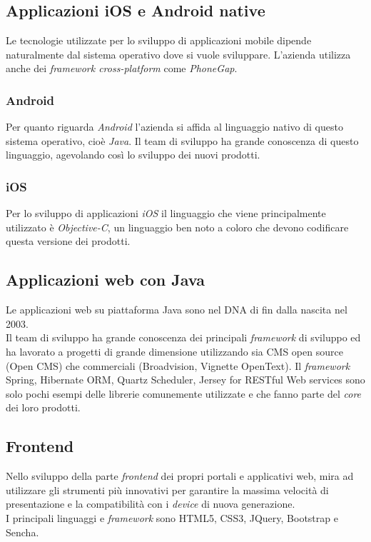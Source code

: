 \subsection{Applicazioni iOS e Android native}
Le tecnologie utilizzate per lo sviluppo di applicazioni mobile dipende naturalmente dal sistema operativo dove si vuole sviluppare. L'azienda utilizza anche dei \emph{framework cross-platform} come \emph{PhoneGap}.
\subsubsection{Android}
Per quanto riguarda \emph{Android} l'azienda si affida al linguaggio nativo di questo sistema operativo, cioè \emph{Java}. 
Il team di sviluppo ha grande conoscenza di questo linguaggio, agevolando così lo sviluppo dei nuovi prodotti.
\subsubsection{iOS}
Per lo sviluppo di applicazioni \emph{iOS} il linguaggio che viene principalmente utilizzato è \emph{Objective-C}, un linguaggio ben noto a coloro che devono codificare questa versione dei prodotti.

\subsection{Applicazioni web con Java}
Le applicazioni web su piattaforma Java sono nel DNA di \azienda{} fin dalla nascita nel 2003. \\
Il team di sviluppo ha grande conoscenza dei principali \emph{framework} di sviluppo ed ha lavorato a progetti di grande dimensione utilizzando sia CMS open source (Open CMS) che commerciali (Broadvision, Vignette OpenText).
Il \emph{framework} Spring, Hibernate ORM, Quartz Scheduler, Jersey for RESTful Web services sono solo pochi esempi delle librerie comunemente utilizzate e che fanno parte del \emph{core} dei loro prodotti.

\subsection{Frontend}
Nello sviluppo della parte \emph{frontend} dei propri portali e applicativi web, \azienda{} mira ad utilizzare gli strumenti più innovativi per garantire la massima velocità di presentazione e la compatibilità con i \emph{device} di nuova generazione. \\
I principali linguaggi e \emph{framework} sono HTML5, CSS3, JQuery, Bootstrap e Sencha.

